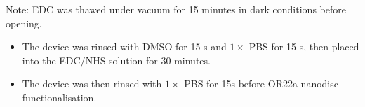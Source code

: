 \documentclass[
  a4paper,
]{scrbook}
\begin{document}
Note: EDC was thawed under vacuum for 15 minutes in dark conditions
before opening.

\begin{itemize}
\item
  The device was rinsed with DMSO for 15 s and \(1 \times\) PBS for 15
  s, then placed into the EDC/NHS solution for 30 minutes.
\item
  The device was then rinsed with \(1 \times\) PBS for 15s before OR22a
  nanodisc functionalisation.
\end{itemize}

\begin{figure}

\begin{minipage}[t]{0.03\linewidth}

{\centering 


}

\end{minipage}%
%
\begin{minipage}[t]{0.01\linewidth}

{\centering 

~

}

\end{minipage}%
%
\begin{minipage}[t]{0.45\linewidth}

{\centering 

}
\end{minipage}
\end{figure}
\end{document}

